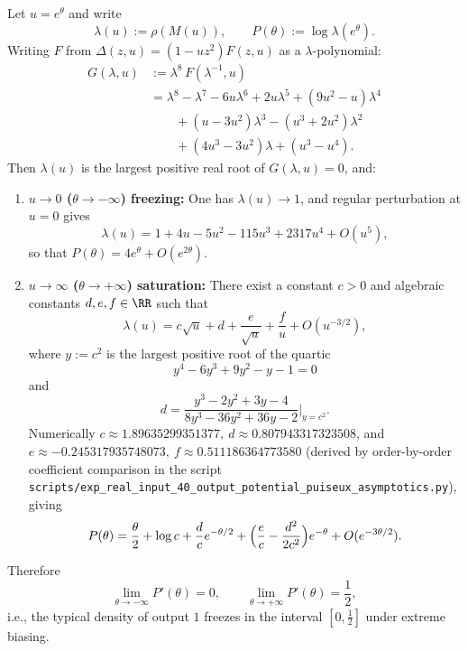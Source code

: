 \begin{proposition}\label{prop:real-input-40-pressure-freezing}
Let $u=e^{\theta}$ and write
\[
\lambda(u):=\rho(M(u)),\qquad P(\theta):=\log\lambda(e^{\theta}).
\]
Writing $F$ from $\Delta(z,u)=(1-uz^2)F(z,u)$ as a $\lambda$-polynomial:
\[
\begin{aligned}
G(\lambda,u)
&:=\lambda^8\,F(\lambda^{-1},u)\\
&=\lambda^8-\lambda^7-6u\lambda^6+2u\lambda^5+(9u^2-u)\lambda^4\\
&\qquad +(u-3u^2)\lambda^3-(u^3+2u^2)\lambda^2\\
&\qquad +(4u^3-3u^2)\lambda+(u^3-u^4).
\end{aligned}
\]
Then $\lambda(u)$ is the largest positive real root of $G(\lambda,u)=0$, and:
\begin{enumerate}
  \item \textbf{$u\to 0$ ($\theta\to-\infty$) freezing:} One has $\lambda(u)\to 1$, and regular perturbation at $u=0$ gives
  \[
  \lambda(u)=1+4u-5u^2-115u^3+2317u^4+O(u^5),
  \]
  so that
  \(
  P(\theta)=4e^{\theta}+O(e^{2\theta})
  \).
  \item \textbf{$u\to\infty$ ($\theta\to+\infty$) saturation:} There exist a constant $c>0$ and algebraic constants $d,e,f\in\RR$ such that
  \[
  \lambda(u)=c\sqrt u+d+\frac{e}{\sqrt u}+\frac{f}{u}+O\!\left(u^{-3/2}\right),
  \]
  where $y:=c^2$ is the largest positive root of the quartic
  \[
  y^4-6y^3+9y^2-y-1=0
  \]
  and
  \[
  d=\frac{y^3-2y^2+3y-4}{8y^3-36y^2+36y-2}\Bigg|_{y=c^2}.
  \]
  Numerically $c\approx 1.89635299351377,\ d\approx 0.807943317323508$,
  and $e\approx -0.245317935748073,\ f\approx 0.511186364773580$
  (derived by order-by-order coefficient comparison in the script \texttt{scripts/exp\_real\_input\_40\_output\_potential\_puiseux\_asymptotics.py}), giving
  \[
  P(\theta)=\frac{\theta}{2}+\log c+\frac{d}{c}e^{-\theta/2}
  +\Bigl(\frac{e}{c}-\frac{d^2}{2c^2}\Bigr)e^{-\theta}+O(e^{-3\theta/2}).
  \]
\end{enumerate}
Therefore
\[
\lim_{\theta\to-\infty}P'(\theta)=0,\qquad \lim_{\theta\to+\infty}P'(\theta)=\frac12,
\]
i.e., the typical density of output $1$ freezes in the interval $[0,\tfrac12]$ under extreme biasing.
\end{proposition}





